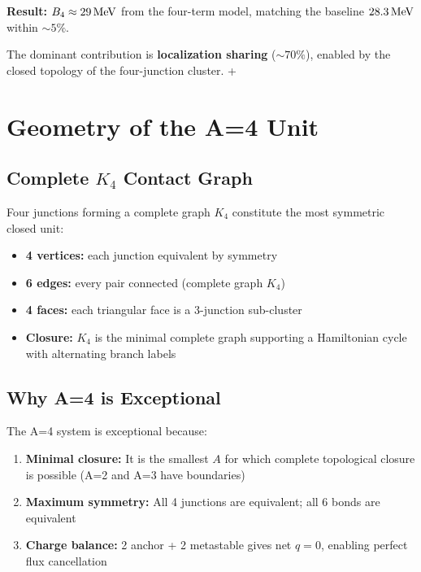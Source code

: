 \begin{resultbox}
    \textbf{Result:} $B_4 \approx 29\,\mathrm{MeV}$ from the four-term model,
    matching the baseline $28.3\,\mathrm{MeV}$ within $\sim 5\%$.

    The dominant contribution is \textbf{localization sharing} ($\sim 70\%$),
    enabled by the closed topology of the four-junction cluster.
    \tagDc + \tagP
\end{resultbox}

\section{Geometry of the A=4 Unit}
\label{sec:he4:geometry}

\subsection{Complete $K_4$ Contact Graph}

Four junctions forming a complete graph $K_4$ constitute the most symmetric
closed unit:

\begin{itemize}
    \item \textbf{4 vertices:} each junction equivalent by symmetry
    \item \textbf{6 edges:} every pair connected (complete graph $K_4$)
    \item \textbf{4 faces:} each triangular face is a 3-junction sub-cluster
    \item \textbf{Closure:} $K_4$ is the minimal complete graph supporting
          a Hamiltonian cycle with alternating branch labels
\end{itemize}

\subsection{Why A=4 is Exceptional}

The A=4 system is exceptional because:

\begin{enumerate}
    \item \textbf{Minimal closure:} It is the smallest $A$ for which
          complete topological closure is possible (A=2 and A=3 have
          boundaries)
    \item \textbf{Maximum symmetry:} All 4 junctions are equivalent;
          all 6 bonds are equivalent
    \item \textbf{Charge balance:} 2 anchor + 2 metastable gives
          net $q = 0$, enabling perfect flux cancellation
\end{enumerate}

